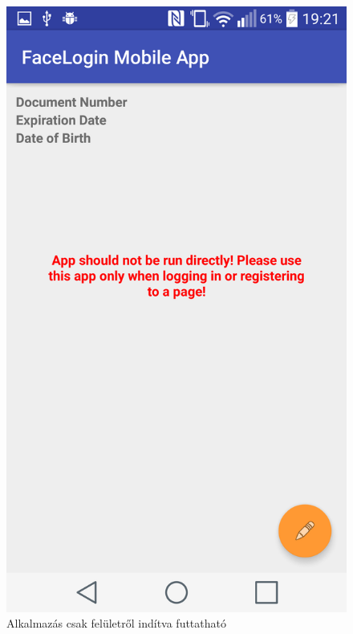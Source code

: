 \begin{figure}[h]
 \begin{minipage}{.50\textwidth} 
\centering
    \includegraphics[scale=0.07]{img/app_should_not_be_run_directly}
    \caption{Alkalmazás csak felületről indítva futtatható}
 \end{minipage}
 \begin{minipage}{.50\textwidth} 
\centering

\end{minipage}
\end{figure}
